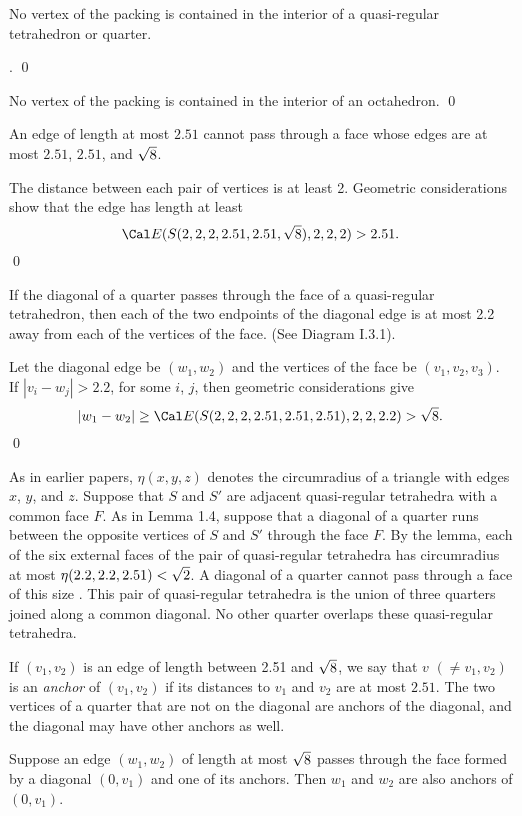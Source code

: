 \bigskip
{}  No vertex of the packing is contained in the
interior of a quasi-regular tetrahedron or quarter.
\endproclaim

 \cite{I.3.5}. \qed\enddemo

  No vertex of the packing is contained in the
interior of an octahedron. \qed\endproclaim

  An edge of length at most $2.51$ cannot pass
through a face whose edges are at most $2.51$, $2.51$, and $\sqrt8$.
\endproclaim

  The distance between each pair of vertices is at least 2.
Geometric considerations
show that the edge has length at least
$${\Cal E}(S(2,2,2,2.51,2.51,\sqr8),2,2,2) > 2.51.$$
\qed\enddemo


  If the diagonal of a quarter passes through the face
of a quasi-regular tetrahedron, then each of the two endpoints of the
diagonal edge is at most 2.2 away from each of the vertices of the face.
(See Diagram I.3.1).  
\endproclaim

  Let the diagonal edge be $(w_1,w_2)$ and the vertices of
the face be $(v_1,v_2,v_3)$.  If $|v_i-w_j|>2.2$, for some $i$, $j$,
then geometric considerations give
$$|w_1-w_2|\ge{\Cal E}(S(2,2,2,2.51,2.51,2.51),2,2,2.2) > \sqr8.$$\qed
\enddemo

As in earlier papers, 
$\eta(x,y,z)$ denotes the circumradius of a triangle with
edges $x$, $y$, and $z$.
Suppose that $S$ and $S'$ are adjacent quasi-regular tetrahedra
with a common face $F$.  As in Lemma 1.4, suppose that a diagonal
of a quarter runs between the opposite vertices of $S$ and $S'$
through the face $F$. 
By the lemma, each of the six external faces of the
pair of quasi-regular tetrahedra
has circumradius at most $\eta(2.2,2.2,2.51)<\sqrt2$.
A diagonal of a quarter  cannot pass through a face of this size
\cite{I.3.2}. 
This pair of quasi-regular tetrahedra is the union of three quarters
joined along a common diagonal.   No other quarter overlaps these
quasi-regular tetrahedra.

If $(v_1,v_2)$ is an edge of length between 2.51 and $\sqrt8$,
we say that $v$ $(\ne v_1,v_2)$ is an {\it anchor\/} of $(v_1,v_2)$ if
its distances to $v_1$ and $v_2$ are at most $2.51$.  
The two vertices of a quarter that
are not on the diagonal are anchors of the diagonal, 
and the diagonal may have other
anchors as well.

  Suppose an edge $(w_1,w_2)$ of length at most $\sqrt8$
passes through the face formed by a diagonal $(0,v_1)$ and one of its anchors.
Then $w_1$ and $w_2$
are also anchors of $(0,v_1)$.
\endproclaim

